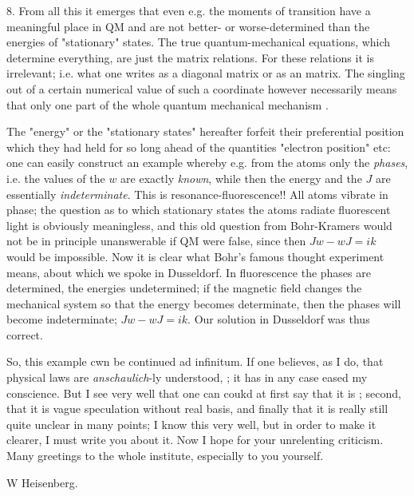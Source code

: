 \documentclass{article}
\begin{document}
8. From all this it emerges that even e.g. the moments of transition have a meaningful place in QM and are not better- or worse-determined than the energies of "stationary" states. The true quantum-mechanical equations, which determine everything, are just the matrix relations. For these relations it is irrelevant; i.e. what one writes as a diagonal matrix or as an  matrix. The singling out of a certain numerical value of such a coordinate however necessarily means that only one part of the whole quantum mechanical mechanism .

The "energy" or the "stationary states" hereafter forfeit their preferential position which they had held for so long ahead of the quantities "electron position" etc: one can easily construct an example whereby e.g. from the atoms only the \textit{phases}, i.e. the values of the $w$ are exactly \textit{known}, while then the energy and the $J$ are essentially \textit{indeterminate}. This is resonance-fluorescence!! All atoms vibrate in phase; the question as to which stationary states the atoms radiate fluorescent light is obviously meaningless, and this old question from Bohr-Kramers would not be in principle unanswerable if QM were false, since then $Jw-wJ=ik$ would be impossible. Now it is clear what Bohr's famous thought experiment means, about which we spoke in Dusseldorf. In fluorescence the phases are determined, the energies undetermined; if the magnetic field changes the mechanical system so that the energy becomes determinate, then the phases will become indeterminate; $Jw-wJ=ik$. Our solution in Dusseldorf was thus correct.

So, this example cwn be continued ad infinitum. If one believes, as I do, that physical laws are \textit{anschaulich}-ly understood, ; it has in any case eased my conscience. But I see very well that one can coukd at first say that it is ; second, that it is vague speculation without real basis, and finally that it is really still quite unclear in many points; I know this very well, but in order to make it clearer, I must write you about it. Now I hope for your unrelenting criticism. Many greetings to the whole institute, especially to you yourself.

W Heisenberg.
\end{document}
